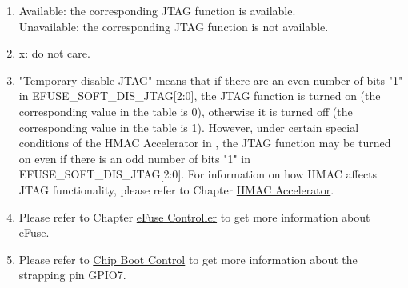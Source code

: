 \begin{tiplisting}
\vspace{-2em}
\begin{enumerate}
\item \label{JTAG footnote: 1}
    Available: the corresponding JTAG function is available. \\
    Unavailable: the corresponding JTAG function is not available.
\item \label{JTAG footnote: 2}
    x: do not care.
\item \label{JTAG footnote: 3}
    "Temporary disable JTAG"  means that if there are an even number of bits "1" in EFUSE\_SOFT\_DIS\_JTAG[2:0], the JTAG function is turned on (the corresponding value in the table is 0), otherwise it is turned off (the corresponding value in the table is 1). However, under certain special conditions of the HMAC Accelerator in \chipname{}, the JTAG function may be turned on even if there is an odd number of bits "1" in EFUSE\_SOFT\_DIS\_JTAG[2:0].
    For information on how HMAC affects JTAG functionality, please refer to Chapter \hyperref[mod:hmac]{HMAC Accelerator}.
\item \label{JTAG footnote: 4}
    Please refer to Chapter \hyperref[mod:efuse]{eFuse Controller} to get more information about eFuse.
\item \label{JTAG footnote: 5}
    Please refer to \hyperref[mod:bootctrl]{Chip Boot Control} to get more information about the strapping pin GPIO7.
\end{enumerate}
\end{tiplisting}
